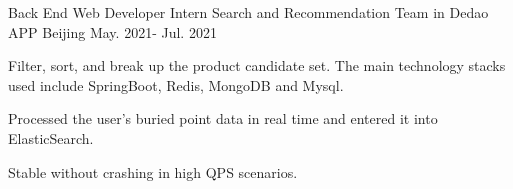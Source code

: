 \begin{cventries}

\cventry
    {Back End Web Developer Intern }
    {Search and Recommendation Team in Dedao APP}
    {Beijing}
    {May. 2021- Jul. 2021}
    {
      \begin{cvitems}
        \item {Filter, sort, and break up the product candidate set. The main technology stacks used include SpringBoot, Redis, MongoDB and Mysql.}
        \item {Processed the user's buried point data in real time and entered it into ElasticSearch.}
        \item {Stable without crashing in high QPS scenarios.}
      \end{cvitems}
    }
 
\end{cventries}